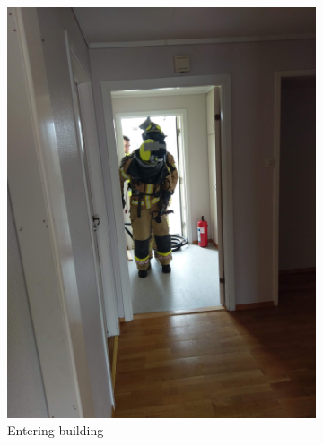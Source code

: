 \documentclass[../Main/thesis.tex]{subfiles}
\begin{document}
\begin{figure}[h]
	\centering
	\begin{subfigure}[t]{0.23\textwidth}
		\vskip 0pt
		\includegraphics[width=\textwidth]{../fig/dive1}
		\caption{Entering building}
		\label{fig:eval-dive1}
	\end{subfigure}
	\begin{subfigure}[t]{0.23\textwidth}
		\vskip 0pt

\end{subfigure}
\end{figure}
\end{document}
